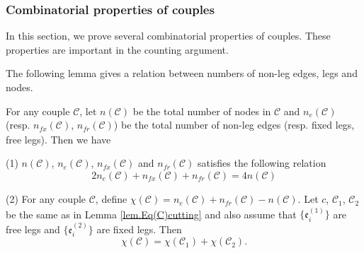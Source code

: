 \subsubsection{Combinatorial properties of couples} In this section, we prove several combinatorial properties of couples. These properties are important in the counting argument.

The following lemma gives a relation between numbers of non-leg edges, legs and nodes.

\begin{lem}\label{lem.eulerchar}
For any couple $\mathcal{C}$, let $n(\mathcal{C})$ be the total number of nodes in $\mathcal{C}$ and $n_e(\mathcal{C})$ (resp. $n_{fx}(\mathcal{C})$, $n_{\textit{fr}}(\mathcal{C})$) be the total number of non-leg edges (resp. fixed legs, free legs). Then we have

(1) $n(\mathcal{C})$, $n_e(\mathcal{C})$, $n_{fx}(\mathcal{C})$ and $n_{\textit{fr}}(\mathcal{C})$ satisfies the following relation
\begin{equation}\label{eq.nnenlnle}
    2n_e(\mathcal{C})+n_{fx}(\mathcal{C})+n_{\textit{fr}}(\mathcal{C})=4n(\mathcal{C})
\end{equation}

(2) For any couple $\mathcal{C}$, define $\chi(\mathcal{C})=n_e(\mathcal{C})+n_{\textit{fr}}(\mathcal{C})-n(\mathcal{C})$. Let $c$, $\mathcal{C}_1$, $\mathcal{C}_2$ be the same as in Lemma \ref{lem.Eq(C)cutting} and also assume that $\{\mathfrak{e}_{i}^{(1)}\}$ are free legs and $\{\mathfrak{e}_{i}^{(2)}\}$ are fixed legs. Then 
\begin{equation}
    \chi(\mathcal{C})=\chi(\mathcal{C}_1)+\chi(\mathcal{C}_2).
\end{equation}

\end{lem}


